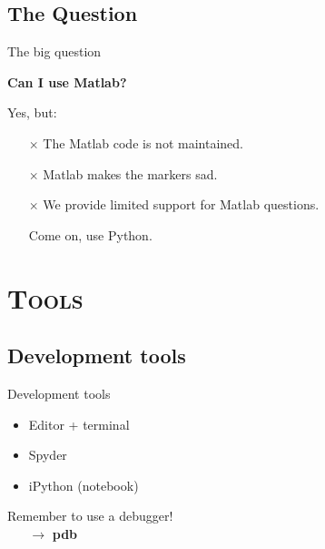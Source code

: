 \documentclass[xcolor=x11names, compress]{beamer}
\renewcommand{\(}{\begin{columns}}
\renewcommand{\)}{\end{columns}}
\newcommand{\<}[1]{\begin{column}{#1}}
\renewcommand{\>}{\end{column}}
\begin{document}
\subsection{The Question}
\begin{frame}{The big question}

  \large

  \textbf{\Large Can I use Matlab?}

  \vspace{20pt}
  \pause

  Yes, but:

  \vspace{3pt}

  \begin{itemize}
    \newcommand{\myitem}{\vspace{3pt} \pause \item[{\color{darkgreen}\checkmark}]}
    \newcommand{\baditem}{\vspace{3pt} \pause \item[{\color{red}$\boldsymbol\times$}]}
    \baditem The Matlab code is not maintained.
    \baditem Matlab makes the markers sad.
    \baditem We provide limited support for Matlab questions.
    \myitem Come on, use Python.
  \end{itemize}

\end{frame}


\section{ \scshape Tools}
\subsection{Development tools}
\begin{frame}{Development tools}

  \Large
  \begin{itemize}
    \newcommand{\myitem}{\vfill \pause \item}
    \myitem Editor + terminal
    \myitem Spyder
    \myitem iPython (notebook)
  \end{itemize}

  \vfill
  \pause

  Remember to use a debugger! \\
  ~ ~ $\rightarrow$ \textbf{pdb}

\end{frame}
\end{document}
